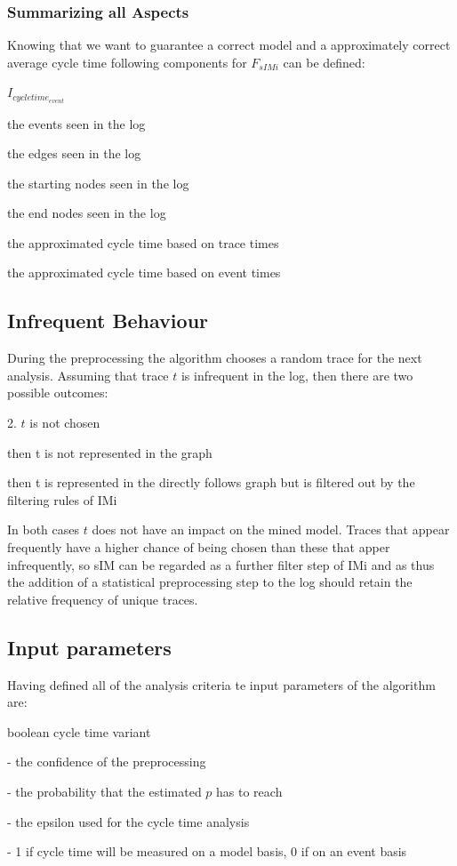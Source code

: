 \documentclass[
	a4paper,
	pagesize,
	pdftex,
	12pt,
	twoside, %
	BCOR=5mm, %
	ngerman,
	fleqn,
	final,
	]{scrartcl}
\begin{document}
\subsubsection{Summarizing all Aspects}
Knowing that we want to guarantee a correct model and a approximately correct average cycle time following components for $F_{sIMi}$ can be defined:
\begin{labeling}{$I_{cycle time_{event}}$}
\item[$I_{event}$] the events seen in the log
\item[$I_{edges}$] the edges seen in the log
\item[$I_{start}$] the starting nodes seen in the log
\item[$I_{ending}$] the end nodes seen in the log
\item[$I_{cycle time_{model}}$] the approximated cycle time based on trace times
\item[$I_{cycle time_{event}}$] the approximated cycle time based on event times
\end{labeling}
\subsection{Infrequent Behaviour}
During the preprocessing the algorithm chooses a random trace for the next analysis.
Assuming that trace $t$ is infrequent in the log, then there are two possible outcomes:
\begin{labeling}{2. $t$ is not chosen}
	\item [2. $t$ is not chosen] then t is not represented in the graph
	\item [1. $t$ is chosen] then t is represented in the directly follows graph but is filtered out by the filtering rules of IMi
\end{labeling}
In both cases $t$ does not have an impact on the mined model.
Traces that appear frequently have a higher chance of being chosen than these that apper infrequently, so sIM can be regarded as a further filter step of IMi and as thus the addition of a statistical preprocessing step to the log should retain the relative frequency of unique traces.
\subsection{Input parameters}
Having defined all of the analysis criteria te input parameters of the algorithm are:
\begin{labeling}{boolean cycle time variant}
	\item [float $\alpha$] - the confidence of the preprocessing
	\item [float $\delta$] - the probability that the estimated $p$ has to reach
	\item [float $\epsilon$] - the epsilon used for the cycle time analysis
	\item [boolean cycle time variant] - 1 if cycle time will be measured on a model basis, 0 if on an event basis
\end{labeling}
\end{document}
